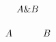 \documentclass{article}
\begin{document}
\[\begin{tikzcd}
  A \& B
\end{tikzcd}\]

\[\begin{tikzcd}[ampersand replacement=\&,]
  A \& B
\end{tikzcd}\]
\end{document}
